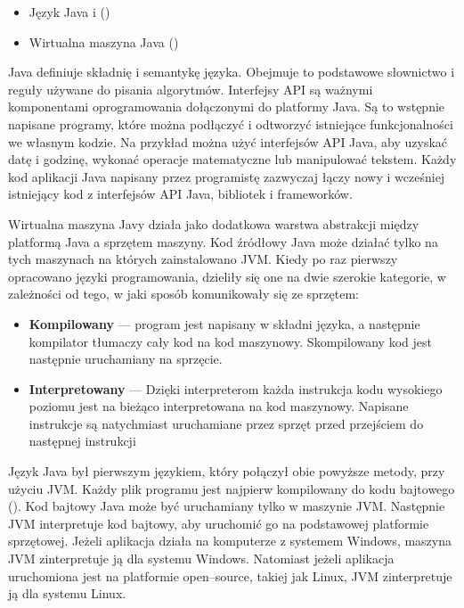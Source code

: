 \begin{itemize}
    \item Język Java i ()
    \item Wirtualna maszyna Java  ()
\end{itemize}

Java definiuje składnię i semantykę języka. Obejmuje to podstawowe słownictwo i reguły używane do pisania algorytmów. 
Interfejsy API są ważnymi komponentami oprogramowania dołączonymi do platformy Java. Są to wstępnie napisane programy, które można podłączyć i odtworzyć istniejące funkcjonalności we własnym kodzie. Na przykład można użyć interfejsów API Java, aby uzyskać datę i godzinę, wykonać operacje matematyczne lub manipulować tekstem. Każdy kod aplikacji Java napisany przez programistę zazwyczaj łączy nowy i wcześniej istniejący kod z interfejsów API Java, bibliotek i frameworków\cite{frameworkDef}\cite{javaAmazon}\cite{javaDEV}.

Wirtualna maszyna Javy działa jako dodatkowa warstwa abstrakcji między platformą Java a sprzętem maszyny. Kod źródłowy Java może działać tylko na tych maszynach na których zainstalowano JVM. Kiedy po raz pierwszy opracowano języki programowania, dzieliły się one na dwie szerokie kategorie, w zależności od tego, w jaki sposób komunikowały się ze sprzętem: 

\begin{itemize}
    \item \textbf{Kompilowany} --- program jest napisany w składni języka, a następnie kompilator tłumaczy cały kod na kod maszynowy. Skompilowany kod jest następnie uruchamiany na sprzęcie.
    \item \textbf{Interpretowany} --- Dzięki interpreterom każda instrukcja kodu wysokiego poziomu jest na bieżąco interpretowana na kod maszynowy. Napisane instrukcje są natychmiast uruchamiane przez sprzęt przed przejściem do następnej instrukcji
\end{itemize}

Język Java był pierwszym językiem, który połączył obie powyższe metody, przy użyciu JVM. Każdy plik programu jest najpierw kompilowany do kodu bajtowego (). Kod bajtowy Java może być uruchamiany tylko w maszynie JVM. Następnie JVM interpretuje kod bajtowy, aby uruchomić go na podstawowej platformie sprzętowej. Jeżeli aplikacja działa na komputerze z systemem Windows, maszyna JVM zinterpretuje ją dla systemu Windows. Natomiast jeżeli aplikacja uruchomiona jest na platformie open--source, takiej jak Linux, JVM zinterpretuje ją dla systemu Linux\cite{javaAmazon}\cite{javaDEV}.

